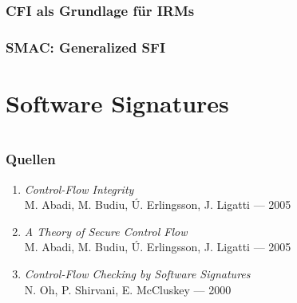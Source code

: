 \documentclass[serif,slidestop,compress,red]{beamer}
\begin{document}
\begin{frame}
  \frametitle{CFI als Grundlage für IRMs}
\end{frame}

\begin{frame}
  \frametitle{SMAC: Generalized SFI}
\end{frame}

\section{Software Signatures}

\section{}

\begin{frame}
  \frametitle{Quellen}
  \begin{enumerate}
    \item \emph{Control-Flow Integrity} \\ M. Abadi, M. Budiu, Ú. Erlingsson, J. Ligatti — 2005
    \item \emph{A Theory of Secure Control Flow} \\ M. Abadi, M. Budiu, Ú. Erlingsson, J. Ligatti — 2005
    \item \emph{Control-Flow Checking by Software Signatures} \\ N. Oh, P. Shirvani, E. McCluskey — 2000
  \end{enumerate}
\end{frame}
\end{document}
